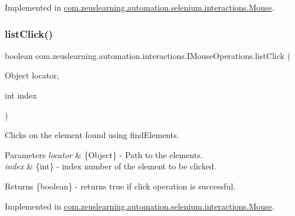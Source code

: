 Implemented in \hyperlink{classcom_1_1zeuslearning_1_1automation_1_1selenium_1_1interactions_1_1Mouse_a82e9cde3b736af28bad478dbf2d69889}{com.\+zeuslearning.\+automation.\+selenium.\+interactions.\+Mouse}.

\hypertarget{interfacecom_1_1zeuslearning_1_1automation_1_1interactions_1_1IMouseOperations_a77d60ff998cd36e27cb131a0c54f1690}{}\label{interfacecom_1_1zeuslearning_1_1automation_1_1interactions_1_1IMouseOperations_a77d60ff998cd36e27cb131a0c54f1690} 
\subsubsection{\texorpdfstring{list\+Click()}{listClick()}}
{\footnotesize\ttfamily boolean com.\+zeuslearning.\+automation.\+interactions.\+I\+Mouse\+Operations.\+list\+Click (\begin{DoxyParamCaption}\item[{Object}]{locator,  }\item[{int}]{index }\end{DoxyParamCaption})}

Clicks on the element found using find\+Elements.


\begin{DoxyParams}{Parameters}
{\em locator} & \{Object\} -\/ Path to the elements. \\
\hline
{\em index} & \{int\} -\/ index number of the element to be clicked.\\
\hline
\end{DoxyParams}
\begin{DoxyReturn}{Returns}
\{boolean\} -\/ returns {\ttfamily true} if click operation is successful. 
\end{DoxyReturn}


Implemented in \hyperlink{classcom_1_1zeuslearning_1_1automation_1_1selenium_1_1interactions_1_1Mouse_ae7d7e20e0aa4c531d441da986d4fa3f0}{com.\+zeuslearning.\+automation.\+selenium.\+interactions.\+Mouse}.

\hypertarget{interfacecom_1_1zeuslearning_1_1automation_1_1interactions_1_1IMouseOperations_aa1bf6db6bfa6e6f2ed2376433c42956a}{}\label{interfacecom_1_1zeuslearning_1_1automation_1_1interactions_1_1IMouseOperations_aa1bf6db6bfa6e6f2ed2376433c42956a} 
